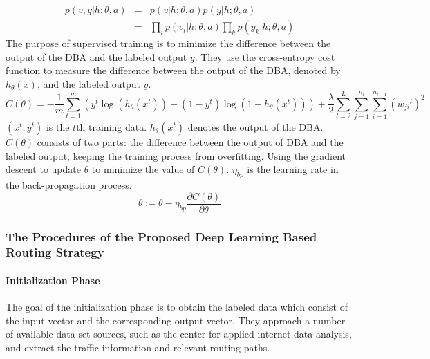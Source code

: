 \documentclass[11pt]{report}
\begin{document}
	\begin{eqnarray}
	p\left(v,y|h;\theta,a\right) &=& p\left(v|h;\theta,a\right)p\left(y|h;\theta,a\right)\\
	&=&\prod_{i}p\left(v_i|h;\theta,a\right)\prod_{k}p\left(y_k|h;\theta,a\right)
	\end{eqnarray}
	The purpose of supervised training is to minimize the difference between the output of the DBA and the labeled output $y$.
	They use the cross-entropy cost function to measure the difference between the output of the DBA, denoted by $h_\theta\left(x\right)$, and the labeled output $y$.
	\begin{equation}
	C\left(\theta\right)=-\frac{1}{m}\sum_{t=1}^{m}\left(y^t\log\left(h_\theta\left(x^t\right)\right)+\left(1-y^t\right)\log\left(1-h_\theta\left(x^t\right)\right)\right)+\frac{\lambda}{2}\sum_{l=2}^{L}\sum_{j=1}^{n_l}\sum_{i=1}^{n_{l-1}}\left({w_{ji}}^l\right)^2
	\end{equation}
	$\left(x^t,y^t\right)$ is the $t$th training data. $h_\theta\left(x^t\right)$ denotes the output of the DBA. $C\left(\theta\right)$ consists of two parts: the difference between the output of DBA and the labeled output, keeping the training process from overfitting. Using the gradient descent to update $\theta$ to minimize the value of $C\left(\theta\right)$. $\eta_{bp}$ is the learning rate in the back-propagation process.
	\begin{equation}
	\theta:=\theta-\eta_{bp}\frac{\partial C\left(\theta\right)}{\partial\theta}
	\end{equation}
	
	\subsubsection{The Procedures of the Proposed Deep Learning Based Routing Strategy}
	\paragraph{Initialization Phase}
	The goal of the initialization phase is to obtain the labeled data which consist of the input vector and the corresponding output vector. They approach a number of available data set sources, such as the center for applied internet data analysis, and extract the traffic information and relevant routing paths.
\end{document}
